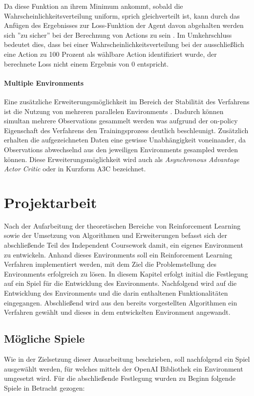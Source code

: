 \documentclass[11pt]{scrartcl}
\begin{document}
Da diese Funktion an ihrem Minimum ankommt, sobald die Wahrscheinlichkeitsverteilung uniform,
sprich gleichverteilt ist, kann durch das Anfügen des Ergebnisses zur Loss-Funktion der
Agent davon abgehalten werden sich ''zu sicher'' bei der Berechnung von Actions zu sein
\cite[~S.269 f.]{L2018}. Im Umkehrschluss bedeutet dies, dass bei einer
Wahrscheinlichkeitsverteilung bei der ausschließlich eine Action zu 100 Prozent als wählbare
Action identifiziert wurde, der berechnete Loss nicht einem Ergebnis von 0 entspricht.

\paragraph*{Multiple Environments} 
\label{sec:multiple_envs}
\noindent
\newline
Eine zusätzliche Erweiterungsmöglichkeit im Bereich der Stabilität des Verfahrens ist die Nutzung
von mehreren parallelen Environments \cite[~S.270]{L2018}. Dadurch können simultan mehrere
Observations gesammelt werden was aufgrund der on-policy Eigenschaft des Verfahrens den
Trainingsprozess deutlich beschleunigt. Zusätzlich erhalten die aufgezeichneten Daten eine
gewisse Unabhängigkeit voneinander, da Observations abwechselnd aus den jeweiligen Environments
gesampled werden können. Diese Erweiterungsmöglichkeit wird auch als \textit{Asynchronous Advantage
Actor Critic} oder in Kurzform A3C bezeichnet.

\newpage
\section{Projektarbeit}
Nach der Aufarbeitung der theoretischen Bereiche von Reinforcement Learning sowie der Umsetzung von
Algorithmen und Erweiterungen befasst sich der abschließende Teil des Independent Coursework damit,
ein eigenes Environment zu entwickeln. Anhand dieses Environments soll ein Reinforcement Learning
Verfahren implementiert werden, mit dem Ziel die Problemstellung des Environments erfolgreich zu 
lösen. In diesem Kapitel erfolgt initial die Festlegung auf ein Spiel für die Entwicklung des
Environments. Nachfolgend wird auf die Entwicklung des Environments und die darin enthaltenen
Funktionalitäten eingegangen. Abschließend wird aus den bereits vorgestellten Algorithmen ein
Verfahren gewählt und dieses in dem entwickelten Environment angewandt. 

\subsection{Mögliche Spiele}
Wie in der Zielsetzung dieser Ausarbeitung beschrieben, soll nachfolgend ein Spiel ausgewählt werden,
für welches mittels der OpenAI Bibliothek ein Environment umgesetzt wird. Für die abschließende
Festlegung wurden zu Beginn folgende Spiele in Betracht gezogen:
\end{document}
